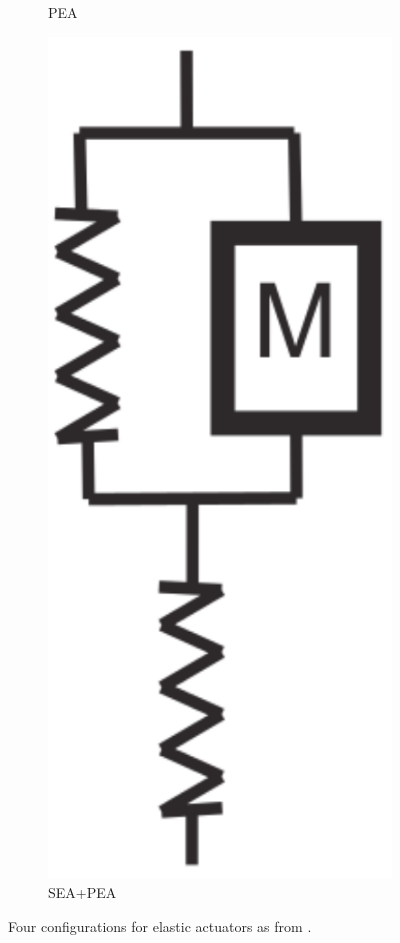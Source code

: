 \begin{figure}[htb]
\begin{subfigure}{.15\textwidth}
    \caption{PEA}
    \label{fig:pea}
  \end{subfigure}
  \begin{subfigure}{.15\textwidth}
    \includegraphics[width=\linewidth]{figures/SEA+PEAact.pdf}
    \caption{SEA+PEA}
    \label{fig:sea_pea}
  \end{subfigure}
  \caption{Four configurations for elastic actuators as from \cite{grimmer}.}
  \label{fig:pasive_actuators}
\end{figure}  


